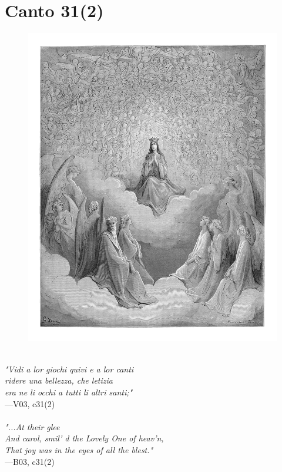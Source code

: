 \documentclass[../Dore_vision.tex]{subfiles}
\begin{document}
\newpage

\section{Canto 31(2)}

\begin{figure}[ht]
\centering
\includegraphics[height=\figsize]{illustrations/book_3/V03, c31(2).jpg}
\end{figure}

\begin{center}
\begin{minipage}{0.8\linewidth}
\textit{\\
"Vidi a lor giochi quivi e a lor canti\\ridere una bellezza, che letizia\\era ne li occhi a tutti li altri santi;"} \\
—V03, c31(2) \\~\\
\textit{"...At their glee\\And carol, smil' d the Lovely One of heav'n,\\That joy was in the eyes of all the blest."} \\
—B03, c31(2)
\end{minipage}
\end{center}
\end{document}
